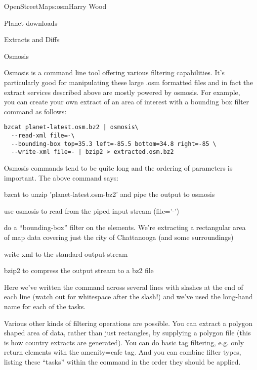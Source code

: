 \begin{aosachapter}{OpenStreetMap}{s:osm}{Harry Wood}
\begin{aosasect1}{Planet downloads}
\begin{aosasect2}{Extracts and Diffs}
\end{aosasect2}

\begin{aosasect2}{Osmosis}

Osmosis is a command line tool offering various filtering
capabilities. It's particularly good for manipulating these large .osm
formatted files and in fact the extract services described above are
mostly powered by osmosis. For example, you can create your own
extract of an area of interest with a bounding box filter command as
follows:

\begin{verbatim}
bzcat planet-latest.osm.bz2 | osmosis\
  --read-xml file=-\
  --bounding-box top=35.3 left=-85.5 bottom=34.8 right=-85 \
  --write-xml file=- | bzip2 > extracted.osm.bz2
\end{verbatim}

Osmosis commands tend to be quite long and the ordering of parameters
is important. The above command says:

\begin{aosaitemize}

\item bzcat to unzip 'planet-latest.osm-bz2' and pipe the output to
  osmosis

\item use osmosis to read from the piped input stream (file='-')

\item do a ``bounding-box'' filter on the elements. We're extracting a
  rectangular area of map data covering just the city of Chattanooga
  (and some surroundings)

\item write xml to the standard output stream

\item bzip2 to compress the output stream to a bz2 file

\end{aosaitemize}

Here we've written the command across several lines with slashes at
the end of each line (watch out for whitespace after the slash!) and
we've used the long-hand name for each of the tasks.

Various other kinds of filtering operations are possible. You can
extract a polygon shaped area of data, rather than just rectangles, by
supplying a polygon file (this is how country extracts are
generated). You can do basic tag filtering, e.g. only return elements
with the amenity=cafe tag. And you can combine filter types, listing
these ``tasks'' within the command in the order they should be
applied.


\end{aosasect2}
\end{aosasect1}
\end{aosachapter}
